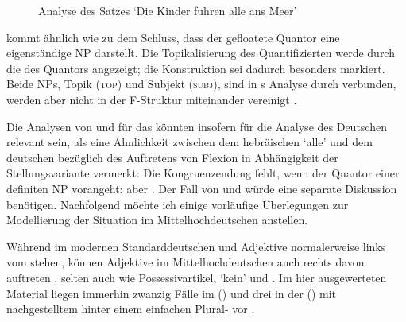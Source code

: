 \begin{figure}
	\caption{Analyse des Satzes  `Die Kinder
		fuhren alle ans Meer'}
	\label{fig:hebrqf}
\end{figure}

\citet[533--534]{spector2009} kommt ähnlich wie \citet[29]{pittner1995} zu dem
Schluss, dass der gefloatete Quantor eine eigenständige NP
darstellt. Die Topikalisierung des Quantifizierten werde durch die
 des Quantors angezeigt; die Konstruktion sei dadurch
besonders markiert. Beide NPs, Topik (\textsc{top}) und
Subjekt (\textsc{subj}), sind in \citeauthor{spector2009}s Analyse durch
 verbunden, werden aber nicht in der
F-Struktur miteinander vereinigt
\autocite[vgl.][99]{bresnanetal2016}.

Die Analysen von \citet{shlonsky1991} und \citet{spector2009} für das
 könnten insofern für die Analyse des Deutschen
relevant sein, als \citet[179]{merchant1996} eine Ähnlichkeit zwischen dem
hebräischen  `alle' und dem deutschen
 bezüglich des Auftretens von Flexion in Abhängigkeit der
Stellungsvariante vermerkt: Die Kongruenzendung
fehlt, wenn der Quantor einer definiten NP
vorangeht:  aber . Der Fall von  und
 würde eine separate Diskussion benötigen.
Nachfolgend möchte ich einige vorläufige Überlegungen zur Modellierung der
Situation im Mittelhochdeutschen anstellen.

Während im modernen Standarddeutschen  und
Adjektive normalerweise links vom 
stehen, können Adjektive im Mittelhochdeutschen auch
rechts davon auftreten \autocite[185--186, 237--243]{ksw2}, selten auch
 wie Possessivartikel,  `kein' und
 \autocite[515--517, 551--552, 623--624]{ksw2}. Im hier
ausgewerteten Material liegen immerhin zwanzig Fälle im  (\CAO) und drei in der  (\KC)
mit nachgestelltem  hinter einem einfachen Plural-
vor .

